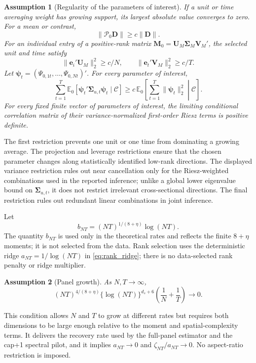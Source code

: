 \documentclass[11pt]{article}
\numberwithin{equation}{section}
\newtheorem{assumption}{Assumption}
\theoremstyle{remark}
\newcommand{\Ezero}{\mathbb E_0}
\newcommand{\be}{\bm e}
\newcommand{\bD}{\bm D}
\newcommand{\bM}{\bm M}
\newcommand{\bU}{\bm U}
\newcommand{\bV}{\bm V}
\newcommand{\bSigma}{\bm\Sigma}
\newcommand{\calP}{\mathcal P}
\begin{document}
\begin{assumption}[Regularity of the parameters of interest]
\label{a:target}
If a unit or time averaging weight has growing support, its largest absolute value converges to zero. For a mean or contrast,
$$
\|\calP_0\bD\|\ge c\|\bD\|.
$$
For an individual entry of a positive-rank matrix $\bM_0=\bU_M\bSigma_M\bV_M'$, the selected unit and time satisfy
$$
\|\be_i'\bU_M\|_2^2\ge c/N,
\qquad
\|\be_t'\bV_M\|_2^2\ge c/T.
$$
Let $\bm\psi_t=(\Psi_{0,1t},\ldots,\Psi_{0,Nt})'$. For every parameter of interest,
$$
\sum_{t=1}^{T}
\Ezero[
\bm\psi_t'\bm\Sigma_{u,t}\bm\psi_t
\mid\mathscr C]
\ge
c\,
\Ezero\!\left[
\sum_{t=1}^{T}\|\bm\psi_t\|_2^2
\middle|\mathscr C
\right].
$$
For every fixed finite vector of parameters of interest, the limiting conditional correlation matrix of their variance-normalized first-order Riesz terms is positive definite.
\end{assumption}
The first restriction prevents one unit or one time from dominating a growing average. The projection and leverage restrictions ensure that the chosen parameter changes along statistically identified low-rank directions. The displayed variance restriction rules out near cancellation only for the Riesz-weighted combinations used in the reported inference; unlike a global lower eigenvalue bound on $\bm\Sigma_{u,t}$, it does not restrict irrelevant cross-sectional directions. The final restriction rules out redundant linear combinations in joint inference.

Let
\begin{equation}
\label{eq:tail_scale}
b_{NT}=(NT)^{1/(8+\eta)}\log(NT).
\end{equation}
The quantity $b_{NT}$ is used only in the theoretical rates and reflects the finite $8+\eta$ moments; it is not selected from the data. Rank selection uses the deterministic ridge $a_{NT}=1/\log(NT)$ in \eqref{eq:rank_ridge}; there is no data-selected rank penalty or ridge multiplier.

\begin{assumption}[Panel growth]
\label{a:growth}
As $N,T\to\infty$,
\begin{equation}
\label{eq:panel_growth}
(NT)^{4/(8+\eta)}
\{\log(NT)\}^{d_s+6}
\left(\frac1N+\frac1T\right)
\longrightarrow0.
\end{equation}
\end{assumption}
This condition allows $N$ and $T$ to grow at different rates but requires both dimensions to be large enough relative to the moment and spatial-complexity terms. It delivers the recovery rate used by the full-panel estimator and the cap+1 spectral pilot, and it implies $a_{NT}\to0$ and $\zeta_{NT}/a_{NT}\to0$. No aspect-ratio restriction is imposed.
\end{document}
